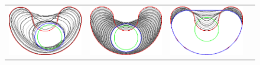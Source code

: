 \begin{figure}
\begin{tabular}{cccc}
\includegraphics[scale=0.18]{figures/chapter9/free-elastica/localsearch/bean/len_pen-0.01/radius-7/summary.pdf} & 
\includegraphics[scale=0.18]{figures/chapter9/free-elastica/flipflow/bean/len_pen-0.01/radius-7/summary.pdf} &
\includegraphics[scale=0.18]{figures/chapter9/free-elastica/balanceflow/bean/len_pen-0.01/radius-7/summary.pdf} &

\end{tabular}
\end{figure}
